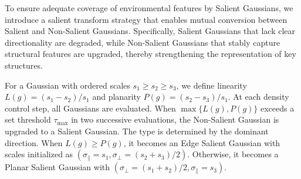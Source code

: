 \documentclass[letterpaper, 10 pt, conference]{ieeeconf}  %
\begin{document}
To ensure adequate coverage of environmental features by Salient Gaussians, we introduce a salient transform strategy that enables mutual conversion between Salient and Non-Salient Gaussians. Specifically, Salient Gaussians that lack clear directionality are degraded, while Non-Salient Gaussians that stably capture structural features are upgraded, thereby strengthening the representation of key structures.



For a Gaussian with ordered scales $s_{1}\geq s_{2}\geq s_{3}$, we define linearity $L(g)=({s_{1}-s_{2}})/{s_{1}}$ and planarity $P(g)=({s_{2}-s_{3}})/{s_{1}}$. At each density control step, all Gaussians are evaluated. When $\max \{L(g), P(g)\}$ exceeds a set threshold $\tau_{\text{max}}$ in two successive evaluations, the Non-Salient Gaussian is upgraded to a Salient Gaussian. The type is determined by the dominant direction. When $L(g)\geq P(g)$, it becomes an Edge Salient Gaussian with scales initialized as $(\sigma_{\|}=s_{1}, \sigma_{\perp}=(s_{2}+s_{3})/2)$. Otherwise, it becomes a Planar Salient Gaussian with $(\sigma_{\perp}=(s_{1}+s_{2})/2, \sigma_{\|}=s_{3})$.
\end{document}
